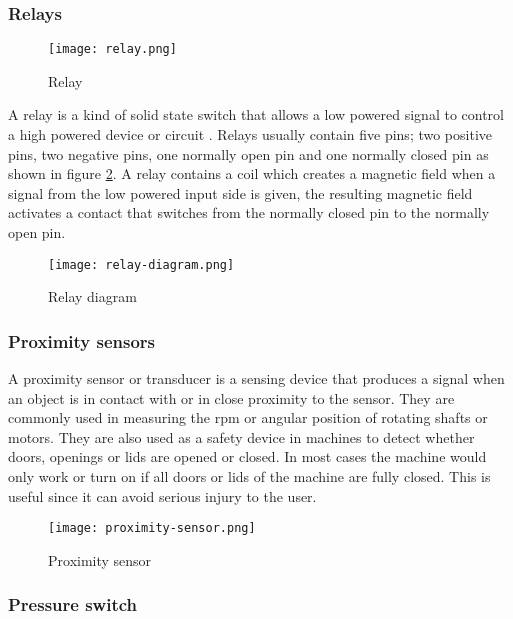 \documentclass[a4paper,12pt]{article}
\begin{document}
				\subsubsection*{Relays}
				
				\begin{figure}[H]
							\centering
							\texttt{[image: relay.png]}
							\caption{Relay}
							\label{fig:relay}
						\end{figure}
						
				A relay is a kind of solid state switch that allows a low powered signal to control a high powered device or circuit \citep{relays}.
				Relays usually contain five pins; two positive pins, two negative pins, one normally open pin and one normally closed pin as shown in figure \ref{fig:relay-diagram}.
				A relay contains a coil which creates a magnetic field when a signal from the low powered input side is given, the resulting magnetic field activates a contact that switches from the normally closed pin to the normally open pin.
				
					\begin{figure}[H]
							\centering
							\texttt{[image: relay-diagram.png]}
							\caption{Relay diagram}
							\label{fig:relay-diagram}
						\end{figure}
						
				\newpage
				\subsubsection*{Proximity sensors}
				
				A proximity sensor or transducer is a sensing device that produces a signal when an object is in contact with or in close proximity to the sensor.
				They are commonly used in measuring the rpm or angular position of rotating shafts or motors.
				They are also used as a safety device in machines to detect whether doors, openings or lids are opened or closed.
				In most cases the machine would only work or turn on if all doors or lids of the machine are fully closed.
				This is useful since it can avoid serious injury to the user. 
						\begin{figure}[H]
							\centering
							\texttt{[image: proximity-sensor.png]}
							\caption{Proximity sensor}
							\label{fig:proximity-sensor}
						\end{figure}
						
				\subsubsection*{Pressure switch}
				
\end{document}
